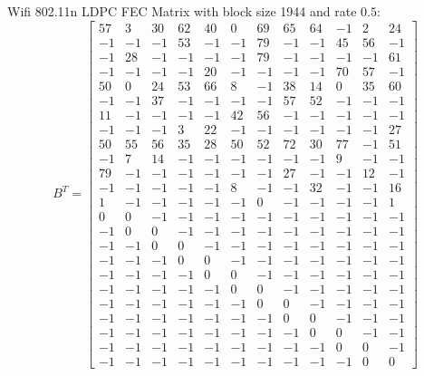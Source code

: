 Wifi 802.11n LDPC FEC Matrix with block size 1944 and rate $0.5$:
\begin{equation}
    B^T = \left[\begin{matrix}
        57 &  3 & 30 & 62 & 40 &  0 & 69 & 65 & 64 & -1 &  2 & 24 \\
        -1 & -1 & -1 & 53 & -1 & -1 & 79 & -1 & -1 & 45 & 56 & -1 \\
        -1 & 28 & -1 & -1 & -1 & -1 & 79 & -1 & -1 & -1 & -1 & 61 \\
        -1 & -1 & -1 & -1 & 20 & -1 & -1 & -1 & -1 & 70 & 57 & -1 \\
        50 &  0 & 24 & 53 & 66 &  8 & -1 & 38 & 14 &  0 & 35 & 60 \\
        -1 & -1 & 37 & -1 & -1 & -1 & -1 & 57 & 52 & -1 & -1 & -1 \\
        11 & -1 & -1 & -1 & -1 & 42 & 56 & -1 & -1 & -1 & -1 & -1 \\
        -1 & -1 & -1 &  3 & 22 & -1 & -1 & -1 & -1 & -1 & -1 & 27 \\
        50 & 55 & 56 & 35 & 28 & 50 & 52 & 72 & 30 & 77 & -1 & 51 \\
        -1 &  7 & 14 & -1 & -1 & -1 & -1 & -1 & -1 &  9 & -1 & -1 \\
        79 & -1 & -1 & -1 & -1 & -1 & -1 & 27 & -1 & -1 & 12 & -1 \\
        -1 & -1 & -1 & -1 & -1 &  8 & -1 & -1 & 32 & -1 & -1 & 16 \\
         1 & -1 & -1 & -1 & -1 & -1 &  0 & -1 & -1 & -1 & -1 &  1 \\
         0 &  0 & -1 & -1 & -1 & -1 & -1 & -1 & -1 & -1 & -1 & -1 \\
        -1 &  0 &  0 & -1 & -1 & -1 & -1 & -1 & -1 & -1 & -1 & -1 \\
        -1 & -1 &  0 &  0 & -1 & -1 & -1 & -1 & -1 & -1 & -1 & -1 \\
        -1 & -1 & -1 &  0 &  0 & -1 & -1 & -1 & -1 & -1 & -1 & -1 \\
        -1 & -1 & -1 & -1 &  0 &  0 & -1 & -1 & -1 & -1 & -1 & -1 \\
        -1 & -1 & -1 & -1 & -1 &  0 &  0 & -1 & -1 & -1 & -1 & -1 \\
        -1 & -1 & -1 & -1 & -1 & -1 &  0 &  0 & -1 & -1 & -1 & -1 \\
        -1 & -1 & -1 & -1 & -1 & -1 & -1 &  0 &  0 & -1 & -1 & -1 \\
        -1 & -1 & -1 & -1 & -1 & -1 & -1 & -1 &  0 &  0 & -1 & -1 \\
        -1 & -1 & -1 & -1 & -1 & -1 & -1 & -1 & -1 &  0 &  0 & -1 \\
        -1 & -1 & -1 & -1 & -1 & -1 & -1 & -1 & -1 & -1 &  0 &  0
    \end{matrix}\right]
\end{equation}